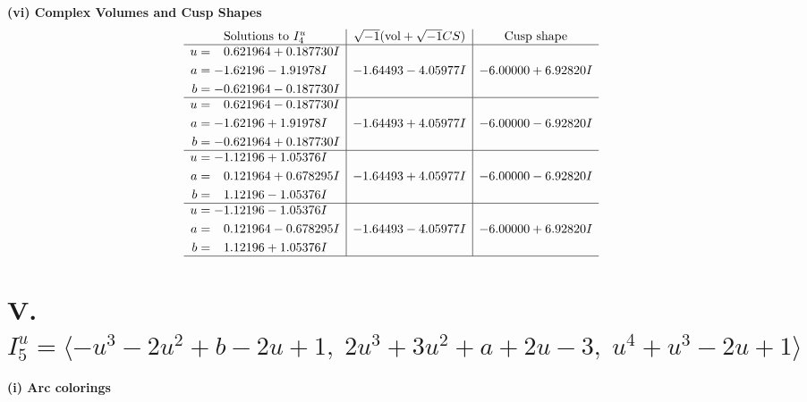 \documentclass[1p]{elsarticle_modified}
\theoremstyle{definition}
\newcommand{\I}{\sqrt{-1}}
\begin{document}
\newpage\flushleft \textbf{(vi) Complex Volumes and Cusp Shapes}
$$\begin{array}{c|c|c}  
\text{Solutions to }I^u_{4}& \I (\text{vol} + \sqrt{-1}CS) & \text{Cusp shape}\\
 \hline 
\begin{aligned}
u &= \phantom{-}0.621964 + 0.187730 I \\
a &= -1.62196 - 1.91978 I \\
b &= -0.621964 - 0.187730 I\end{aligned}
 & -1.64493 - 4.05977 I & -6.00000 + 6.92820 I \\ \hline\begin{aligned}
u &= \phantom{-}0.621964 - 0.187730 I \\
a &= -1.62196 + 1.91978 I \\
b &= -0.621964 + 0.187730 I\end{aligned}
 & -1.64493 + 4.05977 I & -6.00000 - 6.92820 I \\ \hline\begin{aligned}
u &= -1.12196 + 1.05376 I \\
a &= \phantom{-}0.121964 + 0.678295 I \\
b &= \phantom{-}1.12196 - 1.05376 I\end{aligned}
 & -1.64493 + 4.05977 I & -6.00000 - 6.92820 I \\ \hline\begin{aligned}
u &= -1.12196 - 1.05376 I \\
a &= \phantom{-}0.121964 - 0.678295 I \\
b &= \phantom{-}1.12196 + 1.05376 I\end{aligned}
 & -1.64493 - 4.05977 I & -6.00000 + 6.92820 I\\
 \hline 
 \end{array}$$\newpage\newpage\renewcommand{\arraystretch}{1}
\centering \section*{V. $I^u_{5}= \langle - u^3-2 u^2+b-2 u+1,\;2 u^3+3 u^2+a+2 u-3,\;u^4+u^3-2 u+1 \rangle$}
\flushleft \textbf{(i) Arc colorings}\\
\end{document}
